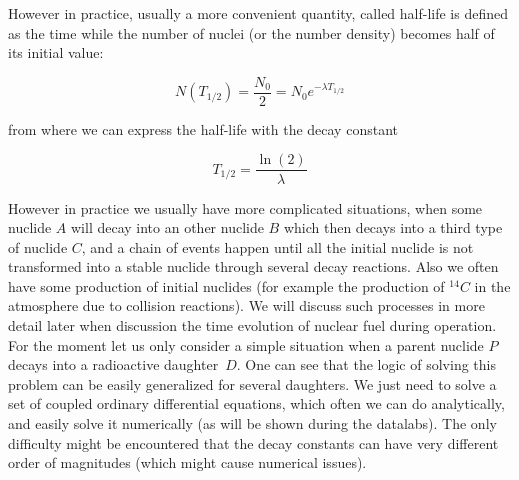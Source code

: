 However in practice, usually a more convenient quantity, called half-life is defined as the time while the number of nuclei (or the number density) becomes half of its initial value:

\begin{equation}
N(T_{1/2})=\frac{N_0}{2}=N_0e^{-\lambda T_{1/2}}
\end{equation}

from where we can express the half-life with the decay constant

\begin{equation}
T_{1/2}=\frac{\ln(2)}{\lambda}
\end{equation}

However in practice we usually have more complicated situations, when some nuclide $A$ will decay into an other nuclide $B$ which then decays into a third type of nuclide $C$, and a chain of events happen until all the initial nuclide is not transformed into a stable nuclide through several decay reactions. Also we often have some production of initial nuclides (for example the production of ${}^{14}C$ in the atmosphere due to collision reactions). We will discuss such processes in more detail later when discussion the time evolution of nuclear fuel during operation. For the moment let us only consider a simple situation when a parent nuclide $P$ decays into a radioactive daughter~$D$. One can see that the logic of solving this problem can be easily generalized for several daughters. We just need to solve a set of coupled ordinary differential equations, which often we can do analytically, and easily solve it numerically (as will be shown during the datalabs). The only difficulty might be encountered that the decay constants can have very different order of magnitudes (which might cause numerical issues).

